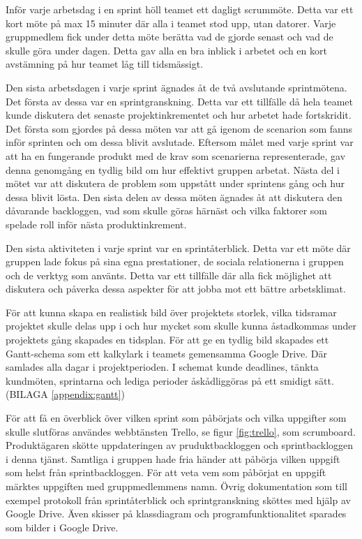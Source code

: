 Inför varje arbetsdag i en sprint höll teamet ett dagligt scrummöte. Detta var ett kort möte på max 15 minuter där alla i teamet stod upp, utan datorer. Varje gruppmedlem fick under detta möte berätta vad de gjorde senast och vad de skulle göra under dagen. Detta gav alla en bra inblick i arbetet och en kort avstämning på hur teamet låg till tidsmässigt.

Den sista arbetsdagen i varje sprint ägnades åt de två avslutande sprintmötena. Det första av dessa var en sprintgranskning. Detta var ett tillfälle då hela teamet kunde diskutera det senaste projektinkrementet och hur arbetet hade fortskridit. Det första som gjordes på dessa möten var att gå igenom de scenarion som fanns inför sprinten och om dessa blivit avslutade. Eftersom målet med varje sprint var att ha en fungerande produkt med de krav som scenarierna representerade, gav denna genomgång en tydlig bild om hur effektivt gruppen arbetat. Nästa del i mötet var att diskutera de problem som uppstått under sprintens gång och hur dessa blivit lösta. Den sista delen av dessa möten ägnades åt att diskutera den dåvarande backloggen, vad som skulle göras härnäst och vilka faktorer som spelade roll inför nästa produktinkrement.

Den sista aktiviteten i varje sprint var en sprintåterblick. Detta var ett möte där gruppen lade fokus på sina egna prestationer, de sociala relationerna i gruppen och de verktyg som använts. Detta var ett tillfälle där alla fick möjlighet att diskutera och påverka dessa aspekter för att jobba mot ett bättre arbetsklimat.

För att kunna skapa en realistisk bild över projektets storlek, vilka tidsramar projektet skulle delas upp i och hur mycket som skulle kunna åstadkommas under projektets gång skapades en tidsplan. För att ge en tydlig bild skapades ett Gantt-schema \cite{softwareeng} som ett kalkylark i teamets gemensamma Google Drive. Där samlades alla dagar i projektperioden. I schemat kunde deadlines, tänkta kundmöten, sprintarna och lediga perioder åskådliggöras på ett smidigt sätt. (BILAGA \ref{appendix:gantt})

För att få en överblick över vilken sprint som påbörjats och vilka uppgifter som skulle slutföras användes webbtänsten Trello, se figur \ref{fig:trello}, som scrumboard\cite{scrumboard}. Produktägaren skötte uppdateringen av pruduktbackloggen och sprintbackloggen i denna tjänst. Samtliga i gruppen hade fria händer att påbörja vilken uppgift som helst från sprintbackloggen. För att veta vem som påbörjat en uppgift märktes uppgiften med gruppmedlemmens namn. Övrig dokumentation som till exempel protokoll från sprintåterblick och sprintgranskning sköttes med hjälp av Google Drive. Även skisser på klassdiagram och programfunktionalitet sparades som bilder i Google Drive.

